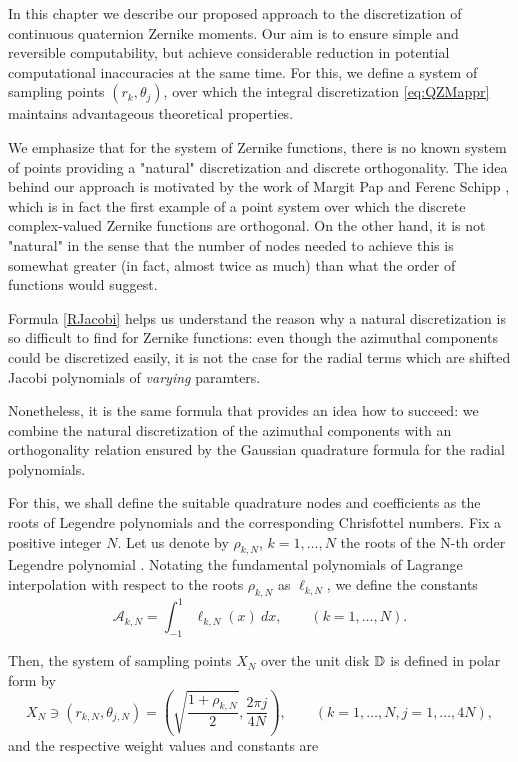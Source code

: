 In this chapter we describe our proposed approach to the discretization of continuous quaternion Zernike moments. Our aim is to ensure simple and reversible computability, but achieve considerable reduction in potential computational inaccuracies at the same time. For this, we define a system of sampling points $(r_k,\theta_j)$, over which the integral discretization \eqref{eq:QZMappr} maintains advantageous theoretical properties. 

We emphasize that for the system of Zernike functions, there is no known system of points providing a "natural" discretization and discrete orthogonality. The idea behind our approach is motivated by the work of Margit Pap and Ferenc Schipp \cite{schipp}, which is in fact the first example of a point system over which the discrete complex-valued Zernike functions are orthogonal. On the other hand, it is not "natural" in the sense that the number of nodes needed to achieve this is somewhat greater (in fact, almost twice as much) than what the order of functions would suggest.

Formula \eqref{RJacobi} helps us understand the reason why a natural discretization is so difficult to find for Zernike functions: even though the azimuthal components could be discretized easily, it is not the case for the radial terms which are shifted Jacobi polynomials of \emph{varying} paramters. 

Nonetheless, it is the same formula that provides an idea how to succeed: we combine the natural discretization of the azimuthal components with an orthogonality relation ensured by the Gaussian quadrature formula for the radial polynomials.

For this, we shall define the suitable quadrature nodes and coefficients as the roots of Legendre polynomials and the corresponding Chrisfottel numbers. Fix a positive integer $N$. Let us denote by $\rho_{k,N}$, $k=1,\ldots,N$ the roots of the N-th order Legendre polynomial \cite{Szego}. Notating the fundamental polynomials of Lagrange interpolation with respect to the roots $\rho_{k,N}$ as $\ell_{k,N}$, we define the constants
\[
	\mathcal{A}_{k,N} = \int_{-1}^{1} \ell_{k,N}(x)\ dx, \qquad (k=1,\ldots,N).
\]

Then, the system of sampling points $X_N$ over the unit disk $\mathbb{D}$ is defined in polar form by
\[
	X_N\ni (r_{k,N}, \theta_{j,N}) = \left(\sqrt{\frac{1+\rho_{k,N}}{2}} , \frac{2\pi j}{4N} \right), \qquad (k=1,\ldots,N,j=1,\ldots,4N),
\]
and the respective weight values and constants are

